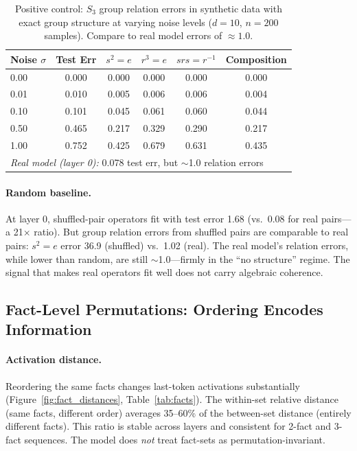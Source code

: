 \documentclass[10pt, letterpaper]{article}
\begin{document}
\begin{table}[t]
\centering
\caption{Positive control: $S_3$ group relation errors in synthetic data with exact group structure at varying noise levels ($d = 10$, $n = 200$ samples). Compare to real model errors of $\approx 1.0$.}
\label{tab:positive}
\small
\begin{tabular}{@{}lccccc@{}}
\toprule
Noise $\sigma$ & Test Err & $s^2\!=\!e$ & $r^3\!=\!e$ & $srs\!=\!r^{-1}$ & Composition \\
\midrule
0.00 & 0.000 & 0.000 & 0.000 & 0.000 & 0.000 \\
0.01 & 0.010 & 0.005 & 0.006 & 0.006 & 0.004 \\
0.10 & 0.101 & 0.045 & 0.061 & 0.060 & 0.044 \\
0.50 & 0.465 & 0.217 & 0.329 & 0.290 & 0.217 \\
1.00 & 0.752 & 0.425 & 0.679 & 0.631 & 0.435 \\
\midrule
\multicolumn{6}{l}{\textit{Real model (layer 0):} 0.078 test err, but $\sim$1.0 relation errors} \\
\bottomrule
\end{tabular}
\end{table}

\paragraph{Random baseline.} At layer 0, shuffled-pair operators fit with test error 1.68 (vs.\ 0.08 for real pairs---a 21$\times$ ratio). But group relation errors from shuffled pairs are comparable to real pairs: $s^2 = e$ error 36.9 (shuffled) vs.\ 1.02 (real). The real model's relation errors, while lower than random, are still $\sim$1.0---firmly in the ``no structure'' regime. The signal that makes real operators fit well does not carry algebraic coherence.

\subsection{Fact-Level Permutations: Ordering Encodes Information}

\paragraph{Activation distance.} Reordering the same facts changes last-token activations substantially (Figure~\ref{fig:fact_distances}, Table~\ref{tab:facts}). The within-set relative distance (same facts, different order) averages 35--60\% of the between-set distance (entirely different facts). This ratio is stable across layers and consistent for 2-fact and 3-fact sequences. The model does \emph{not} treat fact-sets as permutation-invariant.
\end{document}
